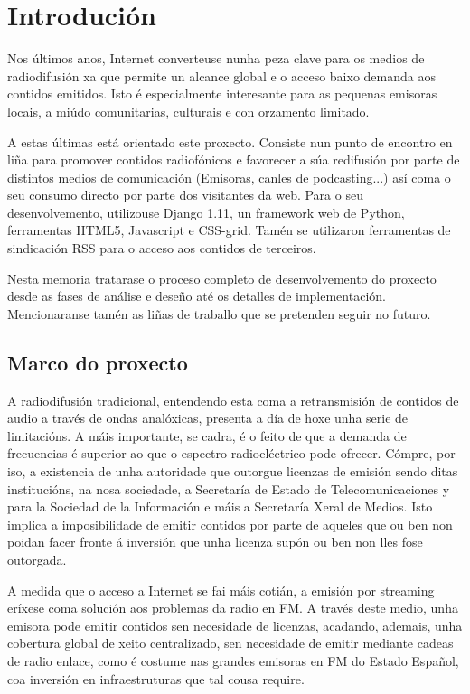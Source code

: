 \chapter[Introducción]{
  \label{chp:introduccion}
  Introdución
}
\minitoc
\newpage

Nos últimos anos, Internet converteuse nunha peza clave para os medios de radiodifusión xa que permite un alcance global e o acceso baixo demanda aos contidos emitidos. Isto é especialmente interesante para as pequenas emisoras locais, a miúdo comunitarias, culturais e con orzamento limitado.

A estas últimas está orientado este proxecto. Consiste nun punto de encontro en liña para promover contidos radiofónicos e favorecer a súa redifusión por parte de distintos medios de comunicación (Emisoras, canles de podcasting...) así coma o seu consumo directo por parte dos visitantes da web. Para o seu desenvolvemento, utilizouse Django 1.11, un framework web de Python, ferramentas HTML5, Javascript e CSS-grid. Tamén se utilizaron ferramentas de sindicación RSS para o acceso aos contidos de terceiros.

Nesta memoria tratarase o proceso completo de desenvolvemento do proxecto desde as fases de análise e deseño até os detalles de implementación. Mencionaranse tamén as liñas de traballo que se pretenden seguir no futuro.

\section{Marco do proxecto}


A radiodifusión tradicional, entendendo esta coma a retransmisión de contidos de audio a través de ondas analóxicas, presenta a día de hoxe unha serie de limitacións. A máis importante, se cadra, é o feito de que a demanda de frecuencias é superior ao que o espectro radioeléctrico pode ofrecer. Cómpre, por iso, a existencia de unha autoridade que outorgue licenzas de emisión sendo ditas institucións, na nosa sociedade, a Secretaría de Estado de Telecomunicaciones y para la Sociedad de la Información e máis a Secretaría Xeral de Medios\cite{BOE}. Isto implica a imposibilidade de emitir contidos por parte de aqueles que ou ben non poidan facer fronte á inversión que unha licenza supón ou ben non lles fose outorgada.

A medida que o acceso a Internet se fai máis cotián, a emisión por streaming eríxese coma solución aos problemas da radio en FM. A través deste medio, unha emisora pode emitir contidos sen necesidade de licenzas, acadando, ademais, unha cobertura global de xeito centralizado, sen necesidade de emitir mediante cadeas de radio enlace, como é costume nas grandes emisoras en FM do Estado Español, coa inversión en infraestruturas que tal cousa require.


